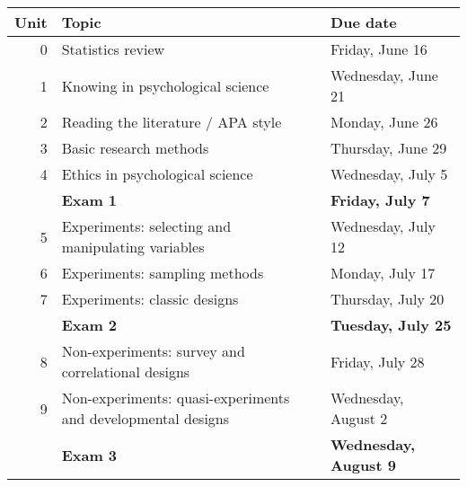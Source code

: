 \documentclass[10pt]{article}
\begin{document}
\begin{center}
\begin{tabular}{rll}
Unit & Topic & Due date\\
\hline
0 & Statistics review & Friday, June 16\\
1 & Knowing in psychological science & Wednesday, June 21\\
2 & Reading the literature / APA style & Monday, June 26\\
3 & Basic research methods & Thursday, June 29\\
4 & Ethics in psychological science & Wednesday, July 5\\
 & \textbf{Exam 1} & \textbf{Friday, July 7}\\
5 & Experiments: selecting and manipulating variables & Wednesday, July 12\\
6 & Experiments: sampling methods & Monday, July 17\\
7 & Experiments: classic designs & Thursday, July 20\\
 & \textbf{Exam 2} & \textbf{Tuesday, July 25}\\
8 & Non-experiments: survey and correlational designs & Friday, July 28\\
9 & Non-experiments: quasi-experiments and developmental designs & Wednesday, August 2\\
 & \textbf{Exam 3} & \textbf{Wednesday, August 9}\\
\end{tabular}
\end{center}
\end{document}
